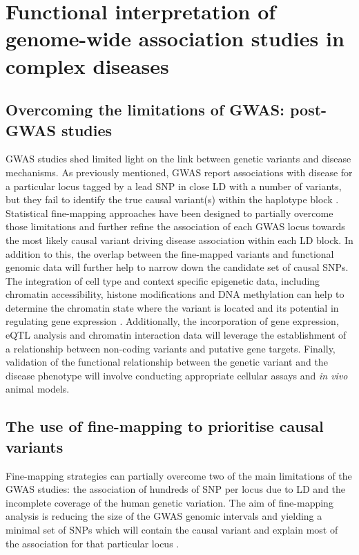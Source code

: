 \section{Functional interpretation of genome-wide association studies in complex diseases}

\subsection{Overcoming the limitations of GWAS: post-GWAS studies}
GWAS studies shed limited light on the link between genetic variants and disease mechanisms. As previously mentioned, GWAS report associations with disease for a particular locus tagged by a lead SNP in close LD with a number of variants, but they fail to identify the true causal variant(s) within the haplotype block . Statistical fine-mapping approaches have been designed to partially overcome those limitations and further refine the association of each GWAS locus towards the most likely causal variant driving disease association within each LD block. In addition to this, the overlap between the fine-mapped variants and functional genomic data will further help to narrow down the candidate set of causal SNPs. The integration of cell type and context specific epigenetic data, including chromatin accessibility, histone modifications and DNA methylation can help to determine the chromatin state where the variant is located and its potential in regulating gene expression . Additionally, the incorporation of gene expression, eQTL analysis and chromatin interaction data will leverage the establishment of a relationship between non-coding variants and putative gene targets. Finally, validation of the functional relationship between the genetic variant and the disease phenotype will involve conducting appropriate cellular assays and \textit{in vivo} animal models.


\subsection{The use of fine-mapping to prioritise causal variants}
Fine-mapping strategies can partially overcome two of the main limitations of the GWAS studies: the association of hundreds of SNP per locus due to LD and the incomplete coverage of the human genetic variation. The aim of fine-mapping analysis is reducing the size of the GWAS genomic intervals and yielding a minimal set of SNPs which will contain the causal variant and explain most of the association for that particular locus \parencite{Spain2015}.

